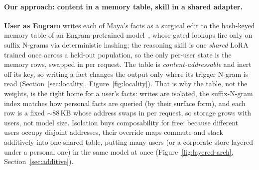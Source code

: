 \documentclass[11pt]{article}
\begin{document}
\paragraph{Our approach: content in a memory table, skill in a shared adapter.}
\textbf{User as Engram} writes each of Maya's facts as a surgical edit
to the hash-keyed memory table of an Engram-pretrained
model~\citep{cheng2026engram}, whose gated lookups fire only on suffix
N-grams via deterministic hashing; the reasoning skill is one
\emph{shared} LoRA trained once across a held-out population, so the
only per-user state is the memory rows, swapped in per request. The
table is \emph{content-addressable} and inert off its key, so writing a fact
changes the output only where its trigger N-gram is read
(Section~\ref{sec:locality}, Figure~\ref{fig:locality}). That is why
the table, not the weights, is the right home for a user's facts:
writes are isolated, the
suffix-N-gram index matches how personal facts are queried (by their
surface form), and each row is a fixed $\sim$88\,KB whose address swaps
in per request, so storage grows with users, not model size.
Isolation buys composability for free: because different users occupy
disjoint addresses, their override maps commute and stack additively
into one shared table, putting many users (or a corporate store layered
under a personal one) in the same model at once (Figure~\ref{fig:layered-arch},
Section~\ref{sec:additive}).
\end{document}
